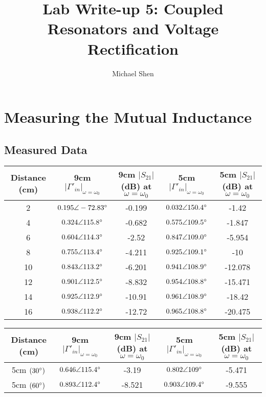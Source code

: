 \documentclass{article}
\begin{document}
\title{Lab Write-up 5: Coupled Resonators and Voltage Rectification}
\author{Michael Shen}
\maketitle


\section{Measuring the Mutual Inductance}

\subsection{Measured Data}
\begin{table}[H]
\centering
\begin{tabular}{|c|c|c|c|c|}
\hline
Distance (cm)& 9cm $\vert\Gamma '_{in}\vert_{\omega=\omega_0}$     
			 & 9cm $\vert S_{21}\vert$ (dB) at $\omega = \omega_0$
			 & 5cm $\vert\Gamma '_{in}\vert_{\omega=\omega_0}$     
			 & 5cm $\vert S_{21}\vert$ (dB) at $\omega = \omega_0$ \\ \hline
2   		 & $0.195\angle-72.83\degree$ & -0.199 & $0.032\angle150.4\degree$  & -1.42   \\ \hline
4   	 	 & $0.324\angle115.8\degree$  & -0.682 & $0.575\angle109.5\degree$  & -1.847  \\ \hline
6   	 	 & $0.604\angle114.3\degree$  & -2.52  & $0.847\angle109.0\degree$  & -5.954  \\ \hline
8		     & $0.755\angle113.4\degree$  & -4.211 & $0.925\angle109.1\degree$  & -10     \\ \hline
10  		 & $0.843\angle113.2\degree$  & -6.201 & $0.941\angle108.9\degree$  & -12.078 \\ \hline
12 			 & $0.901\angle112.5\degree$  & -8.832 & $0.954\angle108.8\degree$  & -15.471 \\ \hline
14 			 & $0.925\angle112.9\degree$  & -10.91 & $0.961\angle108.9\degree$  & -18.42  \\ \hline
16  		 & $0.938\angle112.2\degree$  & -12.72 & $0.965\angle108.8\degree$  & -20.475 \\ \hline
\end{tabular}
\end{table}

\begin{table}[h]
\centering
\begin{tabular}{|c|c|c|c|c|}
\hline
Distance (cm)	  & 9cm $\vert\Gamma '_{in}\vert_{\omega=\omega_0}$      
			 	  & 9cm $\vert S_{21}\vert$ (dB) at $\omega = \omega_0$ 
			 	  & 5cm $\vert\Gamma '_{in}\vert_{\omega=\omega_0}$      
			      & 5cm $\vert S_{21}\vert$ (dB) at $\omega = \omega_0$ \\ \hline
5cm $(30\degree)$ & $0.646\angle115.4\degree$ & -3.19  & $0.802\angle109\degree$   & -5.471 \\ \hline
5cm $(60\degree)$ & $0.893\angle112.4\degree$ & -8.521 & $0.903\angle109.4\degree$ & -9.555 \\ \hline
\end{tabular}
\end{table}
\end{document}
